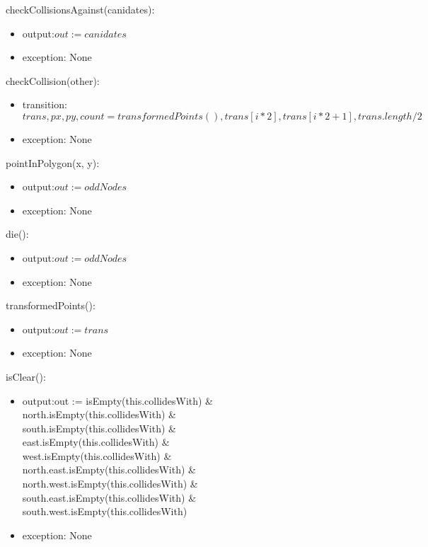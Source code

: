 \documentclass[12pt]{article}
\begin{document}
\noindent checkCollisionsAgainst(canidates):
\begin{itemize}
\item output:$out := canidates$
\item exception: None
\end{itemize}

\noindent checkCollision(other):
\begin{itemize}
\item transition: $trans,px,py,count = transformedPoints(), trans[i*2], trans[i*2 + 1], trans.length/2$
\item exception: None
\end{itemize}

\noindent pointInPolygon(x, y):
\begin{itemize}
\item output:$out := oddNodes$
\item exception: None
\end{itemize}

\noindent die():
\begin{itemize}
\item output:$out := oddNodes$
\item exception: None
\end{itemize}

\noindent transformedPoints():
\begin{itemize}
\item output:$out := trans$
\item exception: None
\end{itemize}

\noindent isClear():
\begin{itemize}
\item output:out := isEmpty(this.collidesWith) \&
			\\
            north.isEmpty(this.collidesWith) \&
            \\
            south.isEmpty(this.collidesWith) \&
            \\
            east.isEmpty(this.collidesWith) \&
            \\
            west.isEmpty(this.collidesWith) \&
            \\
            north.east.isEmpty(this.collidesWith) \&
            \\
            north.west.isEmpty(this.collidesWith) \&
            \\
            south.east.isEmpty(this.collidesWith) \&
            \\
            south.west.isEmpty(this.collidesWith)
\item exception: None
\end{itemize}
\end{document}
